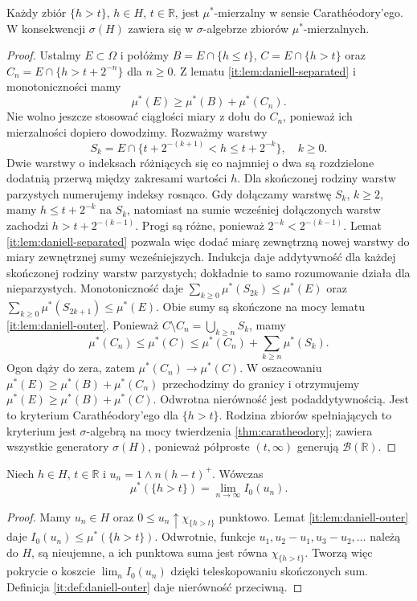 \begin{lemat}\label{it:lem:daniell-measurability}
Każdy zbiór $\{h>t\}$, $h\in H$, $t\in\mathbb{R}$, jest $\mu^*$-mierzalny w sensie Carathéodory'ego. W konsekwencji $\sigma(H)$ zawiera się w $\sigma$-algebrze zbiorów $\mu^*$-mierzalnych.
\end{lemat}
\begin{proof}
Ustalmy $E\subset\Omega$ i połóżmy $B=E\cap\{h\le t\}$, $C=E\cap\{h>t\}$ oraz $C_n=E\cap\{h>t+2^{-n}\}$ dla $n\ge0$. Z lematu \ref{it:lem:daniell-separated} i monotoniczności mamy
\[
 \mu^*(E)\ge\mu^*(B)+\mu^*(C_n).
\]
Nie wolno jeszcze stosować ciągłości miary z dołu do $C_n$, ponieważ ich mierzalności dopiero dowodzimy. Rozważmy warstwy
\[
 S_k=E\cap\{t+2^{-(k+1)}<h\le t+2^{-k}\},\quad k\ge0.
\]
Dwie warstwy o indeksach różniących się co najmniej o dwa są rozdzielone dodatnią przerwą między zakresami wartości $h$. Dla skończonej rodziny warstw parzystych numerujemy indeksy rosnąco. Gdy dołączamy warstwę $S_k$, $k\ge2$, mamy $h\le t+2^{-k}$ na $S_k$, natomiast na sumie wcześniej dołączonych warstw zachodzi $h>t+2^{-(k-1)}$. Progi są różne, ponieważ $2^{-k}<2^{-(k-1)}$. Lemat \ref{it:lem:daniell-separated} pozwala więc dodać miarę zewnętrzną nowej warstwy do miary zewnętrznej sumy wcześniejszych. Indukcja daje addytywność dla każdej skończonej rodziny warstw parzystych; dokładnie to samo rozumowanie działa dla nieparzystych. Monotoniczność daje
$\sum_{k\ge0}\mu^*(S_{2k})\le\mu^*(E)$ oraz
$\sum_{k\ge0}\mu^*(S_{2k+1})\le\mu^*(E)$.
Obie sumy są skończone na mocy lematu \ref{it:lem:daniell-outer}. Ponieważ $C\setminus C_n=\bigcup_{k\ge n}S_k$, mamy
\[
 \mu^*(C_n)\le\mu^*(C)\le
 \mu^*(C_n)+\sum_{k\ge n}\mu^*(S_k).
\]
Ogon dąży do zera, zatem $\mu^*(C_n)\to\mu^*(C)$. W oszacowaniu $\mu^*(E)\ge\mu^*(B)+\mu^*(C_n)$ przechodzimy do granicy i otrzymujemy $\mu^*(E)\ge\mu^*(B)+\mu^*(C)$. Odwrotna nierówność jest podaddytywnością. Jest to kryterium Carathéodory'ego dla $\{h>t\}$. Rodzina zbiorów spełniających to kryterium jest $\sigma$-algebrą na mocy twierdzenia \ref{thm:caratheodory}; zawiera wszystkie generatory $\sigma(H)$, ponieważ półproste $(t,\infty)$ generują $\mathcal B(\mathbb{R})$.
\end{proof}

\begin{lemat}\label{it:lem:daniell-level}
Niech $h\in H$, $t\in\mathbb{R}$ i $u_n=1\wedge n(h-t)^+$. Wówczas
\[
 \mu^*(\{h>t\})=\lim_{n\to\infty}I_0(u_n).
\]
\end{lemat}
\begin{proof}
Mamy $u_n\in H$ oraz $0\le u_n\uparrow\chi_{\{h>t\}}$ punktowo. Lemat \ref{it:lem:daniell-outer} daje $I_0(u_n)\le\mu^*(\{h>t\})$. Odwrotnie, funkcje $u_1,u_2-u_1,u_3-u_2,\ldots$ należą do $H$, są nieujemne, a ich punktowa suma jest równa $\chi_{\{h>t\}}$. Tworzą więc pokrycie o koszcie $\lim_n I_0(u_n)$ dzięki teleskopowaniu skończonych sum. Definicja \ref{it:def:daniell-outer} daje nierówność przeciwną.
\end{proof}

